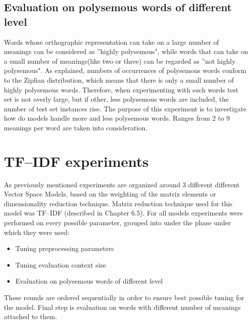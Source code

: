 \subsection{Evaluation on polysemous words of different level } 
Words whose orthographic representation can take on a large number of meanings can be considered
as ''highly polysemous", while words that can take on a small number of meanings(like two or three) can 
be regarded as ''not highly polysemous". As explained, numbers of occurrences of polysemous words 
conform to the Zipfian distribution, which means that there is only a small number of highly polysemous
words. Therefore, when experimenting with such words test set is not overly large, but if other, less
polysemous words are included, the number of test set instances rise. The purpose of this experiment
is to investigate how do models handle more and less polysemous words. Ranges from 2 to 9 meanings per word
are taken into consideration.




\section{TF--IDF experiments}
As previously mentioned experiments are organized around 3 different different Vector Space Models, 
based on the weighting of the matrix elements or dimensionality reduction technique. Matrix reduction technique used for this model was TF--IDF (described in Chapter 6.5). For all models experiments were performed on every possible parameter, grouped into under the phase under which they were used:
\begin{itemize}
\item Tuning preprocessing parameters
\item Tuning evaluation context size
\item Evaluation on polysemous words of different level
\end{itemize}
These rounds are ordered sequentially in order to ensure best possible tuning for the model. Final step
is evaluation on  words with different number of meanings attached to them.

